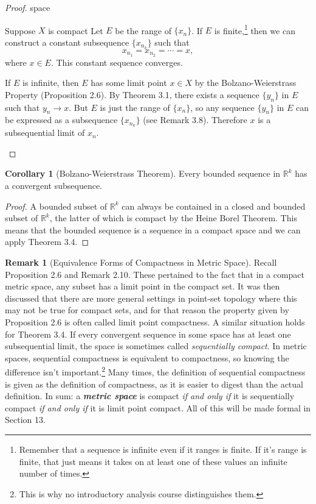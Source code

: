 \documentclass{article}
\newcommand{\R}{\mathbb{R}}
\theoremstyle{definition}
\newtheorem{corollary}{Corollary}[section]
\newtheorem{remark}{Remark}[section]
\begin{document}
	\begin{proof}
		{\color{white}space}
		\begin{enumerate}
				Suppose $X$ is compact Let $ E $ be the range of $ \{x_n\} $. If $ E $ is finite,\footnote{Remember that a sequence is infinite even if it ranges is finite. If it's range is finite, that just means it takes on at least one of these values an infinite number of times.} then we can construct a constant subsequence $ \{x_{n_k}\} $ such that $$x_{n_1}=x_{n_2}=\cdots= x ,$$ where $ x\in E $. This constant sequence converges.
			
			If $ E $ is infinite, then $ E $ has some limit point $ x\in X $ by the Bolzano-Weierstrass Property (Proposition 2.6). By Theorem 3.1, there exists a sequence $ \{y_n\} $ in $ E $ such that $ y_n\to x $. But $ E $ is just the range of $ \{x_n\} $, so any sequence $ \{y_n\} $ in $ E $ can be expressed as a subsequence $ \{x_{n_k}\} $ (see Remark 3.8). Therefore $ x $ is a subsequential limit of $ {x_n} $.  
		\end{enumerate}
	\end{proof}
	\begin{corollary}[Bolzano-Weierstrass Theorem]
		Every bounded sequence in $ \R^k $ has a convergent subsequence. 
	\end{corollary}
	\begin{proof}
		A bounded subset of $ \R^k $ can always be contained in a closed and bounded subset of $\R^k$, the latter of which is compact by the Heine Borel Theorem. This means that the bounded sequence is a sequence in a compact space and we can apply Theorem 3.4.
	\end{proof}
	\begin{remark}[Equivalence Forms of Compactness in Metric Space]
		Recall Proposition 2.6 and Remark 2.10. These pertained to the fact that in a compact metric space, any subset has a limit point in the compact set. It was then discussed that there are more general settings in point-set topology where this may not be true for compact sets, and for that reason the property given by Proposition 2.6 is often called limit point compactness. A similar situation holds for Theorem 3.4. If every convergent sequence in some space has at least one subsequential limit, the space is sometimes called \textit{\color{red}sequentially compact}. In metric spaces, sequential compactness is equivalent to compactness, so knowing the difference isn't important.\footnote{This is why no introductory analysis course distinguishes them.} Many times, the definition of sequential compactness is given as the definition of compactness, as it is easier to digest than the actual definition. In sum: a \textit{\textbf{metric space}} is compact \textit{if and only if} it is sequentially compact \textit{if and only if} it is limit point compact. All of this will be made formal in Section 13.
	\end{remark}
\end{document}
